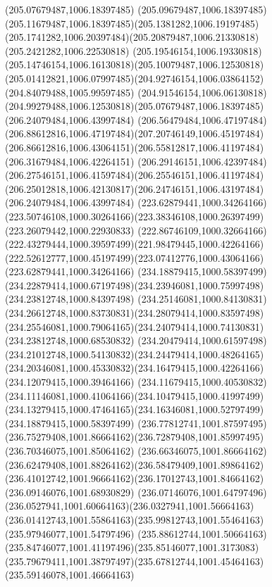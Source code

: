 {{  \moveto(205.07679487,1006.18397485)
  \curveto(205.09679487,1006.18397485)(205.11679487,1006.18397485)(205.1381282,1006.19197485)
  \curveto(205.1741282,1006.20397484)(205.20879487,1006.21330818)(205.2421282,1006.22530818)
  \curveto(205.19546154,1006.19330818)(205.14746154,1006.16130818)(205.10079487,1006.12530818)
  \curveto(205.01412821,1006.07997485)(204.92746154,1006.03864152)(204.84079488,1005.99597485)
  \curveto(204.91546154,1006.06130818)(204.99279488,1006.12530818)(205.07679487,1006.18397485)
  \moveto(206.24079484,1006.43997484)
  \curveto(206.56479484,1006.47197484)(206.88612816,1006.47197484)(207.20746149,1006.45197484)
  \curveto(206.86612816,1006.43064151)(206.55812817,1006.41197484)(206.31679484,1006.42264151)
  \curveto(206.29146151,1006.42397484)(206.27546151,1006.41597484)(206.25546151,1006.41197484)
  \curveto(206.25012818,1006.42130817)(206.24746151,1006.43197484)(206.24079484,1006.43997484)
  \moveto(223.62879441,1000.34264166)
  \curveto(223.50746108,1000.30264166)(223.38346108,1000.26397499)(223.26079442,1000.22930833)
  \curveto(222.86746109,1000.32664166)(222.43279444,1000.39597499)(221.98479445,1000.42264166)
  \curveto(222.52612777,1000.45197499)(223.07412776,1000.43064166)(223.62879441,1000.34264166)
  \moveto(234.18879415,1000.58397499)
  \curveto(234.22879414,1000.67197498)(234.23946081,1000.75997498)(234.23812748,1000.84397498)
  \curveto(234.25146081,1000.84130831)(234.26612748,1000.83730831)(234.28079414,1000.83597498)
  \curveto(234.25546081,1000.79064165)(234.24079414,1000.74130831)(234.23812748,1000.68530832)
  \curveto(234.20479414,1000.61597498)(234.21012748,1000.54130832)(234.24479414,1000.48264165)
  \curveto(234.20346081,1000.45330832)(234.16479415,1000.42264166)(234.12079415,1000.39464166)
  \curveto(234.11679415,1000.40530832)(234.11146081,1000.41064166)(234.10479415,1000.41997499)
  \curveto(234.13279415,1000.47464165)(234.16346081,1000.52797499)(234.18879415,1000.58397499)
  \moveto(236.77812741,1001.87597495)
  \curveto(236.75279408,1001.86664162)(236.72879408,1001.85997495)(236.70346075,1001.85064162)
  \curveto(236.66346075,1001.86664162)(236.62479408,1001.88264162)(236.58479409,1001.89864162)
  \curveto(236.41012742,1001.96664162)(236.17012743,1001.84664162)(236.09146076,1001.68930829)
  \curveto(236.07146076,1001.64797496)(236.0527941,1001.60664163)(236.0327941,1001.56664163)
  \curveto(236.01412743,1001.55864163)(235.99812743,1001.55464163)(235.97946077,1001.54797496)
  \curveto(235.88612744,1001.50664163)(235.84746077,1001.41197496)(235.85146077,1001.3173083)
  \curveto(235.79679411,1001.38797497)(235.67812744,1001.45464163)(235.59146078,1001.46664163)
}}
